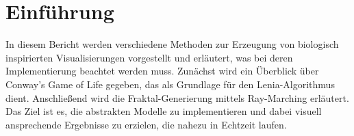 \section*{Einführung} %

In diesem Bericht werden verschiedene Methoden zur Erzeugung von biologisch inspirierten Visualisierungen vorgestellt und erläutert, was bei deren Implementierung beachtet werden muss.
Zunächst wird ein Überblick über Conway's Game of Life gegeben, das als Grundlage für den Lenia-Algorithmus dient.
Anschließend wird die Fraktal-Generierung mittels Ray-Marching erläutert.
Das Ziel ist es, die abstrakten Modelle zu implementieren und dabei visuell ansprechende Ergebnisse zu erzielen, die nahezu in Echtzeit laufen.